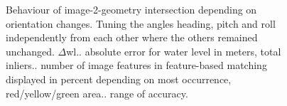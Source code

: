 \documentclass[review]{elsarticle}
\begin{document}
\begin{figure}[htbp!]
\begin{center}
	 	\begin{minipage}{\columnwidth}
	 		\centering
	 	\end{minipage}
	 	\begin{minipage}{\columnwidth}
	 		\centering
	 	\end{minipage}
		\begin{minipage}{\columnwidth} 
	 		\centering
	 	\end{minipage}
	
	\caption{Behaviour of image-2-geometry intersection depending on orientation changes. Tuning the angles heading, pitch and roll independently from each other where the others remained unchanged. ${\Delta}$wl.. absolute error for water level in meters, total inliers.. number of image features in feature-based matching displayed in percent depending on most occurrence, red/yellow/green area.. range of accuracy.}
	\label{fig:sensor_sensi}
\end{center}
\end{figure}
\end{document}
